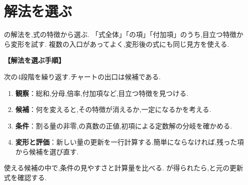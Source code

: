 
\section{解法を選ぶ}\label{節：解法の決定}

  の解法を,式の特徴から選ぶ.
  「式全体」「の項」「付加項」のうち,目立つ特徴から変形を試す.
  複数の入口があってよく,変形後の式にも同じ見方を使える.

  \noindent\textbf{【解法を選ぶ手順】}\par
  次の4段階を繰り返す.チャートの出口は候補である.
  \begin{enumerate}
    \item \textbf{観察}：総和,分母,倍率,付加項など,目立つ特徴を見つける.
    \item \textbf{候補}：何を変えると,その特徴が消えるか,一定になるかを考える.
    \item \textbf{条件}：割る量の非零,の真数の正値,初項による定数解の分岐を確かめる.
    \item \textbf{変形と評価}：新しい量の更新を一行計算する.簡単にならなければ,残った項から候補を選び直す.
  \end{enumerate}
  使える候補の中で,条件の見やすさと計算量を比べる.
  が得られたら,と元の更新式を確認する.
  \BookFigFlowchart


